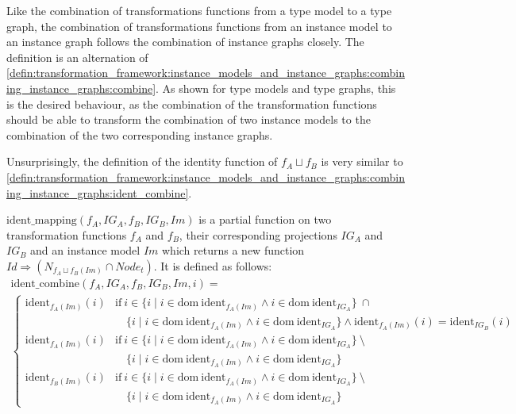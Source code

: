 Like the combination of transformations functions from a type model to a type graph, the combination of transformations functions from an instance model to an instance graph follows the combination of instance graphs closely. The definition is an alternation of \cref{defin:transformation_framework:instance_models_and_instance_graphs:combining_instance_graphs:combine}. As shown for type models and type graphs, this is the desired behaviour, as the combination of the transformation functions should be able to transform the combination of two instance models to the combination of the two corresponding instance graphs.

Unsurprisingly, the definition of the identity function of $f_{A} \sqcup f_{B}$ is very similar to \cref{defin:transformation_framework:instance_models_and_instance_graphs:combining_instance_graphs:ident_combine}.

\begin{defin}
\label{defin:transformation_framework:instance_models_and_instance_graphs:combining_transformation_functions:ident_mapping}
$\mathrm{ident\_\!mapping}(f_A, IG_A, f_B, IG_B, Im)$ is a partial function on two transformation functions $f_A$ and $f_B$, their corresponding projections $IG_A$ and $IG_B$ and an instance model $Im$ which returns a new function \\$Id \Rightarrow (N_{f_{A} \sqcup f_{B}(Im)} \cap Node_t)$. It is defined as follows:
\begin{multline*}
    \mathrm{ident\_\!combine}(f_A, IG_A, f_B, IG_B, Im, i) = \\
    \begin{cases}
        \mathrm{ident}_{f_A(Im)}(i) & \mathrm{if }\ i \in \{i \mid i \in \mathrm{dom}\ \mathrm{ident}_{f_{A}(Im)} \land i \in \mathrm{dom}\ \mathrm{ident}_{IG_A} \}\ \cap\\&\quad \{i \mid i \in \mathrm{dom}\ \mathrm{ident}_{f_{A}(Im)} \land i \in \mathrm{dom}\ \mathrm{ident}_{IG_A} \} \land \mathrm{ident}_{f_A(Im)}(i) = \mathrm{ident}_{IG_B}(i) \\
        \mathrm{ident}_{f_A(Im)}(i) & \mathrm{if }\ i \in \{i \mid i \in \mathrm{dom}\ \mathrm{ident}_{f_{A}(Im)} \land i \in \mathrm{dom}\ \mathrm{ident}_{IG_A} \}\ \setminus\\&\quad\{i \mid i \in \mathrm{dom}\ \mathrm{ident}_{f_{A}(Im)} \land i \in \mathrm{dom}\ \mathrm{ident}_{IG_A} \} \\
        \mathrm{ident}_{f_B(Im)}(i) & \mathrm{if }\ i \in \{i \mid i \in \mathrm{dom}\ \mathrm{ident}_{f_{A}(Im)} \land i \in \mathrm{dom}\ \mathrm{ident}_{IG_A} \}\ \setminus\\&\quad\{i \mid i \in \mathrm{dom}\ \mathrm{ident}_{f_{A}(Im)} \land i \in \mathrm{dom}\ \mathrm{ident}_{IG_A} \}
    \end{cases}
\end{multline*}
\end{defin}

